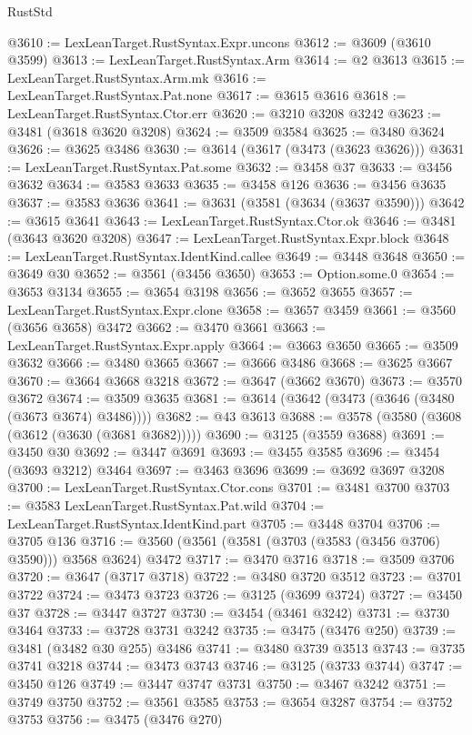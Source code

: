 \begin{lexlean}{RustStd}
\begin{coremodule}
@3610 := LexLeanTarget.RustSyntax.Expr.uncons
@3612 := @3609 (@3610 @3599)
@3613 := LexLeanTarget.RustSyntax.Arm
@3614 := @2 @3613
@3615 := LexLeanTarget.RustSyntax.Arm.mk
@3616 := LexLeanTarget.RustSyntax.Pat.none
@3617 := @3615 @3616
@3618 := LexLeanTarget.RustSyntax.Ctor.err
@3620 := @3210 @3208 @3242
@3623 := @3481 (@3618 @3620 @3208)
@3624 := @3509 @3584
@3625 := @3480 @3624
@3626 := @3625 @3486
@3630 := @3614 (@3617 (@3473 (@3623 @3626)))
@3631 := LexLeanTarget.RustSyntax.Pat.some
@3632 := @3458 @37
@3633 := @3456 @3632
@3634 := @3583 @3633
@3635 := @3458 @126
@3636 := @3456 @3635
@3637 := @3583 @3636
@3641 := @3631 (@3581 (@3634 (@3637 @3590)))
@3642 := @3615 @3641
@3643 := LexLeanTarget.RustSyntax.Ctor.ok
@3646 := @3481 (@3643 @3620 @3208)
@3647 := LexLeanTarget.RustSyntax.Expr.block
@3648 := LexLeanTarget.RustSyntax.IdentKind.callee
@3649 := @3448 @3648
@3650 := @3649 @30
@3652 := @3561 (@3456 @3650)
@3653 := Option.some.{0}
@3654 := @3653 @3134
@3655 := @3654 @3198
@3656 := @3652 @3655
@3657 := LexLeanTarget.RustSyntax.Expr.clone
@3658 := @3657 @3459
@3661 := @3560 (@3656 @3658) @3472
@3662 := @3470 @3661
@3663 := LexLeanTarget.RustSyntax.Expr.apply
@3664 := @3663 @3650
@3665 := @3509 @3632
@3666 := @3480 @3665
@3667 := @3666 @3486
@3668 := @3625 @3667
@3670 := @3664 @3668 @3218
@3672 := @3647 (@3662 @3670)
@3673 := @3570 @3672
@3674 := @3509 @3635
@3681 := @3614 (@3642 (@3473 (@3646 (@3480 (@3673 @3674) @3486))))
@3682 := @43 @3613
@3688 := @3578 (@3580 (@3608 (@3612 (@3630 (@3681 @3682)))))
@3690 := @3125 (@3559 @3688)
@3691 := @3450 @30
@3692 := @3447 @3691
@3693 := @3455 @3585
@3696 := @3454 (@3693 @3212) @3464
@3697 := @3463 @3696
@3699 := @3692 @3697 @3208
@3700 := LexLeanTarget.RustSyntax.Ctor.cons
@3701 := @3481 @3700
@3703 := @3583 LexLeanTarget.RustSyntax.Pat.wild
@3704 := LexLeanTarget.RustSyntax.IdentKind.part
@3705 := @3448 @3704
@3706 := @3705 @136
@3716 := @3560 (@3561 (@3581 (@3703 (@3583 (@3456 @3706) @3590))) @3568 @3624) @3472
@3717 := @3470 @3716
@3718 := @3509 @3706
@3720 := @3647 (@3717 @3718)
@3722 := @3480 @3720 @3512
@3723 := @3701 @3722
@3724 := @3473 @3723
@3726 := @3125 (@3699 @3724)
@3727 := @3450 @37
@3728 := @3447 @3727
@3730 := @3454 (@3461 @3242)
@3731 := @3730 @3464
@3733 := @3728 @3731 @3242
@3735 := @3475 (@3476 @250)
@3739 := @3481 (@3482 @30 @255) @3486
@3741 := @3480 @3739 @3513
@3743 := @3735 @3741 @3218
@3744 := @3473 @3743
@3746 := @3125 (@3733 @3744)
@3747 := @3450 @126
@3749 := @3447 @3747 @3731
@3750 := @3467 @3242
@3751 := @3749 @3750
@3752 := @3561 @3585
@3753 := @3654 @3287
@3754 := @3752 @3753
@3756 := @3475 (@3476 @270)

\end{coremodule}
\end{lexlean}
